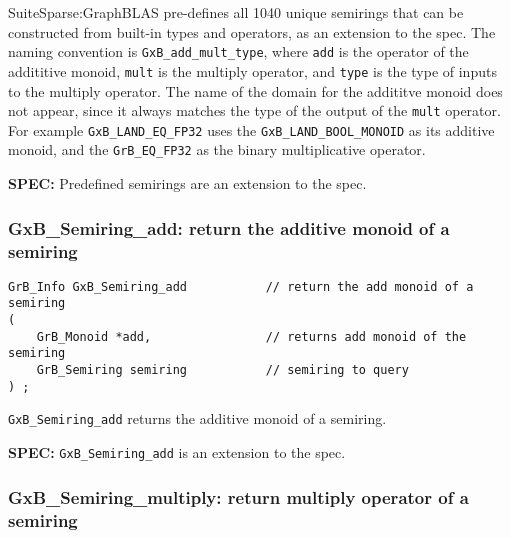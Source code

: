 \documentclass[12pt]{article}
\begin{document}
\vspace{-0.05in}
SuiteSparse:GraphBLAS pre-defines all 1040 unique semirings that can be
constructed from built-in types and operators, as an extension to the spec.
The naming convention is \verb'GxB_add_mult_type', where \verb'add' is the
operator of the addititive monoid, \verb'mult' is the multiply operator, and
\verb'type' is the type of inputs to the multiply operator.  The name of the
domain for the addititve monoid does not appear, since it always matches the
type of the output of the \verb'mult' operator.  For example
\verb'GxB_LAND_EQ_FP32' uses the \verb'GxB_LAND_BOOL_MONOID' as its additive
monoid, and the \verb'GrB_EQ_FP32' as the binary multiplicative operator.

\begin{spec}
{\bf SPEC:} Predefined semirings are an extension to the spec.
\end{spec}

\newpage
\subsubsection{{\sf GxB\_Semiring\_add:} return the additive monoid of a semiring}
\label{semiring_add}

\begin{mdframed}[userdefinedwidth=6in]
{\footnotesize
\begin{verbatim}
GrB_Info GxB_Semiring_add           // return the add monoid of a semiring
(
    GrB_Monoid *add,                // returns add monoid of the semiring
    GrB_Semiring semiring           // semiring to query
) ;
\end{verbatim}
} \end{mdframed}

\verb'GxB_Semiring_add' returns the additive monoid of a semiring.

\begin{spec}
{\bf SPEC:} \verb'GxB_Semiring_add' is an extension to the spec.
\end{spec}

\subsubsection{{\sf GxB\_Semiring\_multiply:} return multiply operator of a semiring}
\label{semiring_multiply}
\end{document}
